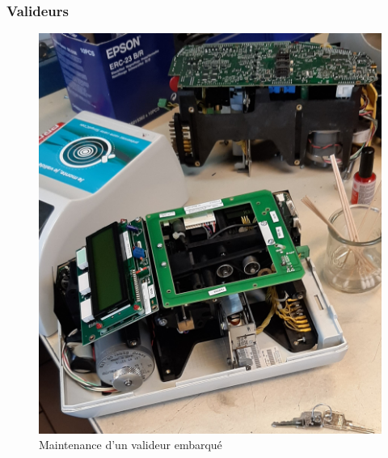 \documentclass{article}
\begin{document}
        \subsubsection{Valideurs}
            \label{Valideurs}
            \begin{figure}[!h]
                \centering
                \includegraphics[scale = 0.1]{Images/valideur.jpg}
                \caption{Maintenance d'un valideur embarqué}
            \end{figure}
\end{document}
